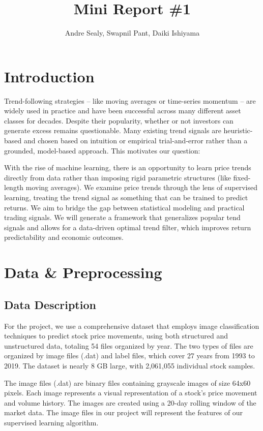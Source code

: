 \documentclass[12pt]{article}
\title{Mini Report \#1}
\author{Andre Sealy, Swapnil Pant, Daiki Ishiyama}
\begin{document}
	
\maketitle

\section*{Introduction}

Trend-following strategies -- like moving averages or time-series momentum -- are widely used in practice and have been successful across many different asset classes for decades. Despite their popularity, whether or not investors can generate excess remains questionable. Many existing trend signals are heuristic-based and chosen based on intuition or empirical trial-and-error rather than a grounded, model-based approach. This motivates our question: 

With the rise of machine learning, there is an opportunity to learn price trends directly from data rather than imposing rigid parametric structures (like fixed-length moving averages). We examine price trends through the lens of supervised learning, treating the trend signal as something that can be trained to predict returns. We aim to bridge the gap between statistical modeling and practical trading signals. We will generate a framework that generalizes popular tend signals and allows for a data-driven optimal trend filter, which improves return predictability and economic outcomes.

\section*{Data \& Preprocessing}
\subsection*{Data Description}

For the project, we use a comprehensive dataset that employs image classification techniques to predict stock price movements, using both structured and unstructured data, totaling 54 files organized by year. The two types of files are organized by image files (.dat) and label files, which cover 27 years from 1993 to 2019. The dataset is nearly 8 GB large, with 2,061,055 individual stock samples.

The image files (.dat) are binary files containing grayscale images of size 64x60 pixels. Each image represents a visual representation of a stock's price movement and volume history. The images are created using a 20-day rolling window of the market data. The image files in our project will represent the features of our supervised learning algorithm.
\end{document}
